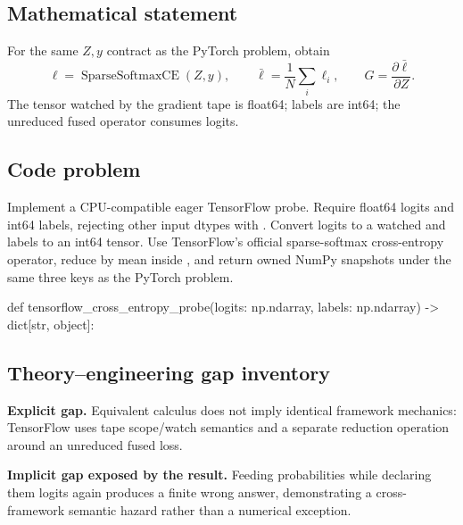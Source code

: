 
        \subsection{Mathematical statement}


For the same $Z,y$ contract as the PyTorch problem, obtain
\[
  \bm\ell=\operatorname{SparseSoftmaxCE}(Z,y),\qquad
  \bar\ell=\frac1N\sum_i\ell_i,\qquad
  G=\frac{\partial\bar\ell}{\partial Z}.
\]
The tensor watched by the gradient tape is float64; labels are int64; the
unreduced fused operator consumes logits.


        \subsection{Code problem}


Implement a CPU-compatible eager TensorFlow probe.  Require float64 logits and
int64 labels, rejecting other input dtypes with .  Convert
logits to a watched
 and labels to an int64 tensor.\newline
Use TensorFlow's official sparse-softmax cross-entropy operator, reduce by mean
inside , and return owned NumPy snapshots under the same three
keys as the PyTorch problem.


        \begin{contractbox}
        \begin{Code}
        def tensorflow_cross_entropy_probe(logits: np.ndarray, labels: np.ndarray) -> dict[str, object]:
        \end{Code}
        \end{contractbox}

        \subsection{Theory--engineering gap inventory}

        \begin{gapbox}
        \textbf{Explicit gap.} Equivalent calculus does not imply identical framework mechanics: TensorFlow uses tape scope/watch semantics and a separate reduction operation around an unreduced fused loss.

        \textbf{Implicit gap exposed by the result.} Feeding probabilities while declaring them logits again produces a finite wrong answer, demonstrating a cross-framework semantic hazard rather than a numerical exception.
        \end{gapbox}


